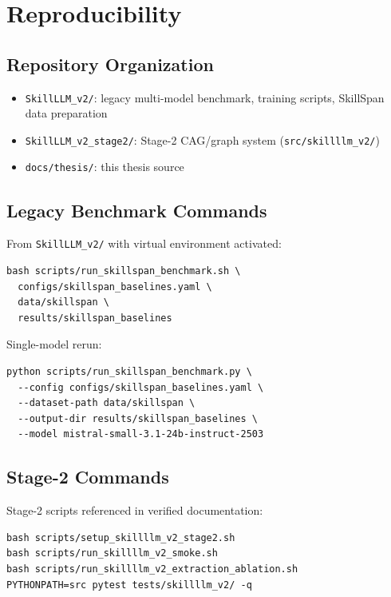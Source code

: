 \chapter{Reproducibility}
\label{ch:reproducibility}

\section{Repository Organization}

\begin{itemize}
  \item \texttt{SkillLLM\_v2/}: legacy multi-model benchmark, training scripts, SkillSpan data preparation
  \item \texttt{SkillLLM\_v2\_stage2/}: Stage-2 CAG/graph system (\texttt{src/skillllm\_v2/})
  \item \texttt{docs/thesis/}: this thesis source
\end{itemize}

\section{Legacy Benchmark Commands}

From \texttt{SkillLLM\_v2/} with virtual environment activated:

\begin{verbatim}
bash scripts/run_skillspan_benchmark.sh \
  configs/skillspan_baselines.yaml \
  data/skillspan \
  results/skillspan_baselines
\end{verbatim}

Single-model rerun:

\begin{verbatim}
python scripts/run_skillspan_benchmark.py \
  --config configs/skillspan_baselines.yaml \
  --dataset-path data/skillspan \
  --output-dir results/skillspan_baselines \
  --model mistral-small-3.1-24b-instruct-2503
\end{verbatim}

\section{Stage-2 Commands}

Stage-2 scripts referenced in verified documentation:

\begin{verbatim}
bash scripts/setup_skillllm_v2_stage2.sh
bash scripts/run_skillllm_v2_smoke.sh
bash scripts/run_skillllm_v2_extraction_ablation.sh
PYTHONPATH=src pytest tests/skillllm_v2/ -q
\end{verbatim}

